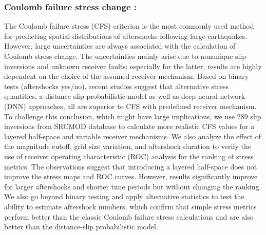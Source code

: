 \documentclass[journal,transmag]{IEEEtran}
\begin{document}
\subsubsection{Coulomb failure stress change :}
\vspace{0.5em}
\par The Coulomb failure stress (CFS) criterion is the most commonly used method for predicting spatial distributions of aftershocks following large earthquakes. However, large uncertainties are always associated with the calculation of Coulomb stress change. The uncertainties mainly arise due to nonunique slip inversions and unknown receiver faults; especially for the latter, results are highly dependent on the choice of the assumed receiver mechanism. Based on binary tests (aftershocks yes/no), recent studies suggest that alternative stress quantities, a distance-slip probabilistic model as well as deep neural network (DNN) approaches, all are superior to CFS with predefined receiver mechanism. To challenge this conclusion, which might have large implications, we use 289 slip inversions from SRCMOD database to calculate more realistic CFS values for a layered half-space and variable receiver mechanisms. We also analyze the effect of the magnitude cutoff, grid size variation, and aftershock duration to verify the use of receiver operating characteristic (ROC) analysis for the ranking of stress metrics. The observations suggest that introducing a layered half-space does not improve the stress maps and ROC curves. However, results significantly improve for larger aftershocks and shorter time periods but without changing the ranking. We also go beyond binary testing and apply alternative statistics to test the ability to estimate aftershock numbers, which confirm that simple stress metrics perform better than the classic Coulomb failure stress calculations and are also better than the distance-slip probabilistic model.\par
\end{document}

